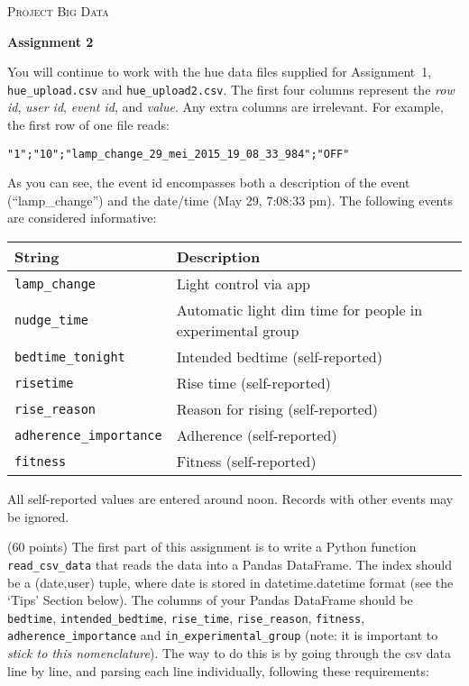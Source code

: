 \documentclass[a4paper]{report}
\theoremstyle{definition}
\newcommand{\blankline}{\par\vspace{5mm}}
\begin{document}
	
\begin{center}
	\textsc{\Large Project Big Data}
	\blankline
	
	\textbf{\large Assignment 2}
\end{center}

You will continue to work with the hue data files supplied for Assignment~1, {\small\texttt{hue\_upload.csv}} and \texttt{\small hue\_upload2.csv}.  The first four columns represent the \emph{row id},	\emph{user id}, \emph{event id}, and \emph{value}. Any extra columns are irrelevant. For example, the first row of one file reads:

\texttt{\small "1";"10";"lamp\_change\_29\_mei\_2015\_19\_08\_33\_984";"OFF"}

As you can see, the event id encompasses both a description of the event (``lamp\_change'') and the date/time (May 29, 7:08:33 pm). The following events are considered informative:

\begin{center}
	\begin{tabular}{|l|l|}
		\hline
		\textbf{String}		& \textbf{Description} \\
		\hline
		\texttt{\small lamp\_change}		& Light control via app \\
		\texttt{\small nudge\_time}		& Automatic light dim time for people in experimental group \\
		\texttt{\small bedtime\_tonight}	& Intended bedtime (self-reported) \\
		\texttt{\small risetime}		& Rise time (self-reported) \\
		\texttt{\small rise\_reason}		& Reason for rising (self-reported) \\
		\texttt{\small adherence\_importance}	& Adherence (self-reported) \\
		\texttt{\small fitness}			& Fitness (self-reported) \\
		\hline
	\end{tabular}
\end{center}

All self-reported values are entered around noon. Records with other events may be ignored.

(60 points) The first part of this assignment is to write a Python function \texttt{\small read\_csv\_data} that reads the data into a Pandas DataFrame. The index should be a (date,user) tuple, where date is stored in datetime.datetime format (see the `Tips' Section below). The columns of your Pandas DataFrame should be \texttt{\small bedtime}, \texttt{\small intended\_bedtime}, \texttt{\small rise\_time}, \texttt{\small rise\_reason}, \texttt{\small fitness}, \texttt{\small adherence\_importance} and \texttt{\small in\_experimental\_group} (note: it is important to \emph{stick to this nomenclature}). The way to do this is by going through the csv data line by line, and parsing each line individually, following these requirements:
	
\end{document}
